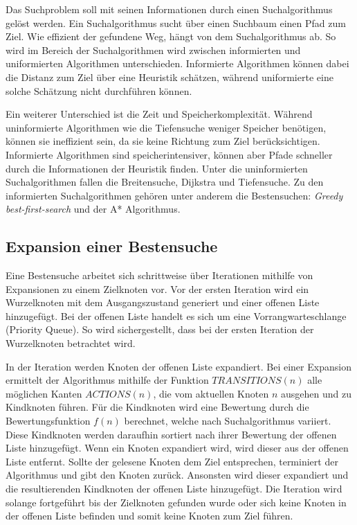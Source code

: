 Das Suchproblem soll mit seinen Informationen durch einen Suchalgorithmus gelöst werden. Ein Suchalgorithmus sucht über einen Suchbaum einen Pfad zum Ziel. Wie effizient der gefundene Weg, hängt von dem Suchalgorithmus ab. So wird im Bereich der Suchalgorithmen wird zwischen informierten und uniformierten Algorithmen unterschieden. Informierte Algorithmen können dabei die Distanz zum Ziel über eine Heuristik schätzen, während uniformierte eine solche Schätzung nicht durchführen können.

Ein weiterer Unterschied ist die Zeit und Speicherkomplexität. Während uninformierte Algorithmen wie die Tiefensuche weniger Speicher benötigen, können sie ineffizient sein, da sie keine Richtung zum Ziel berücksichtigen. Informierte Algorithmen sind speicherintensiver, können aber Pfade schneller durch die Informationen der Heuristik finden.
Unter die uninformierten Suchalgorithmen fallen die Breitensuche, Dijkstra und Tiefensuche. Zu den informierten Suchalgorithmen gehören unter anderem die Bestensuchen: \textit{Greedy best-first-search} und der A* Algorithmus.


\subsection{Expansion einer Bestensuche}

Eine Bestensuche arbeitet sich schrittweise über Iterationen mithilfe von Expansionen zu einem Zielknoten vor. Vor der ersten Iteration wird ein Wurzelknoten mit dem Ausgangszustand generiert und einer offenen Liste hinzugefügt. Bei der offenen Liste handelt es sich um eine Vorrangwarteschlange (Priority Queue). So wird sichergestellt, dass bei der ersten Iteration der Wurzelknoten betrachtet wird.

In der Iteration werden Knoten der offenen Liste expandiert. Bei einer Expansion ermittelt der Algorithmus mithilfe der Funktion $TRANSITIONS(n)$ alle möglichen Kanten $ACTIONS(n)$, die vom aktuellen Knoten $n$ ausgehen und zu Kindknoten führen. Für die Kindknoten wird eine Bewertung durch die Bewertungsfunktion $f(n)$ berechnet, welche nach Suchalgorithmus variiert. Diese Kindknoten werden daraufhin sortiert nach ihrer Bewertung der offenen Liste hinzugefügt. Wenn ein Knoten expandiert wird, wird dieser aus der offenen Liste entfernt. Sollte der gelesene Knoten dem Ziel entsprechen, terminiert der Algorithmus und gibt den Knoten zurück. Ansonsten wird dieser expandiert und die resultierenden Kindknoten der offenen Liste hinzugefügt. Die Iteration wird solange fortgeführt bis der Zielknoten gefunden wurde oder sich keine Knoten in der offenen Liste befinden und somit keine Knoten zum Ziel führen.

